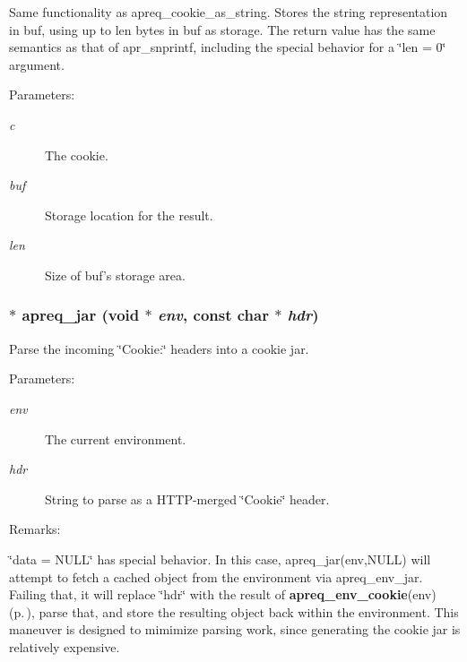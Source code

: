 Same functionality as apreq\_\-cookie\_\-as\_\-string. Stores the string representation in buf, using up to len bytes in buf as storage. The return value has the same semantics as that of apr\_\-snprintf, including the special behavior for a \char`\"{}len = 0\char`\"{} argument.\begin{Desc}
\item[Parameters: ]\par
\begin{description}
\item[{\em 
c}]The cookie. \item[{\em 
buf}]Storage location for the result. \item[{\em 
len}]Size of buf's storage area. \end{description}
\end{Desc}
\subsubsection{$\ast$ apreq\_\-jar ({\bf void} $\ast$ {\em env}, const char $\ast$ {\em hdr})}\label{group__cookies_a4}


Parse the incoming \char`\"{}Cookie:\char`\"{} headers into a cookie jar.\begin{Desc}
\item[Parameters: ]\par
\begin{description}
\item[{\em 
env}]The current environment. \item[{\em 
hdr}]String to parse as a HTTP-merged \char`\"{}Cookie\char`\"{} header. \end{description}
\end{Desc}
\begin{Desc}
\item[Remarks: ]\par
\char`\"{}data = NULL\char`\"{} has special behavior. In this case, apreq\_\-jar(env,NULL) will attempt to fetch a cached object from the environment via apreq\_\-env\_\-jar. Failing that, it will replace \char`\"{}hdr\char`\"{} with the result of {\bf apreq\_\-env\_\-cookie}(env) {\rm (p.\,\pageref{group__ENV_a14})}, parse that, and store the resulting object back within the environment. This maneuver is designed to mimimize parsing work, since generating the cookie jar is relatively expensive. \end{Desc}
